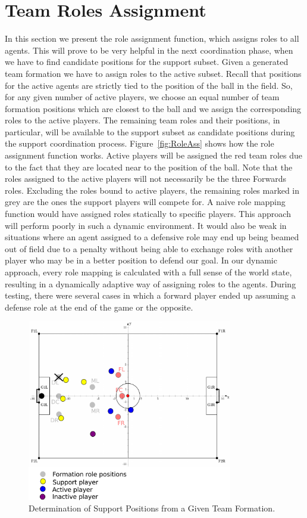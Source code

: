 \section{Team Roles Assignment}
In this section we present the role assignment function, which assigns roles to all agents. This will prove to be very helpful in the next coordination phase, when we have to find candidate positions for the support subset. Given a generated team formation we have to assign roles to the active subset. Recall that positions for the active agents are strictly tied to the position of the ball in the field. So, for any given number of active players, we choose an equal number of team formation positions which are closest to the ball and we assign the corresponding roles to the active players. The remaining team roles and their positions, in particular, will be available to the support subset as candidate positions during the support coordination process. Figure~\ref{fig:RoleAss} shows how the role assignment function works. Active players will be assigned the red team roles due to the fact that they are located near to the position of the ball. Note that the roles assigned to the active players will not necessarily be the three Forwards roles. Excluding the roles bound to active players, the remaining roles marked in grey are the ones the support players will compete for. A naive role mapping function would have assigned roles statically to specific players. This approach will perform poorly in such a dynamic environment. It would also be weak in situations where an agent assigned to a defensive role may end up being beamed out of field due to a penalty without being able to exchange roles with another player who may be in a better position to defend our goal. In our dynamic approach, every role mapping is calculated with a full sense of the world state, resulting in a dynamically adaptive way of assigning roles to the agents. During testing, there were several cases in which a forward player ended up assuming a defense role at the end of the game or the opposite.


\begin{figure}[t!]
\centering
  \includegraphics[width=0.8\textwidth]{Chapter4/figures/SupportPos.pdf}
  \caption{Determination of Support Positions from a Given Team Formation.} 
  \label{fig:SupportPos}
\end{figure}

